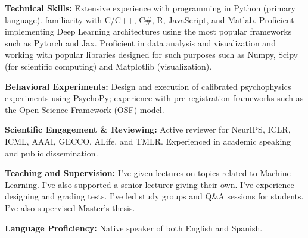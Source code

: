 \documentclass[10pt,a4paper]{article}
\begin{document}
\textbf{Technical Skills:} Extensive experience with programming in Python (primary language). familiarity with C/C++, C\#, R, JavaScript, and Matlab. Proficient implementing Deep Learning architectures using the most popular frameworks such as Pytorch and Jax. Proficient in data analysis and visualization and working with popular libraries designed for such purposes such as Numpy, Scipy (for scientific computing) and Matplotlib (visualization).


\vspace{0.35em}
\textbf{Behavioral Experiments:} Design and execution of calibrated psychophysics experiments using PsychoPy; experience with pre-registration frameworks such as the Open Science Framework (OSF) model.

\vspace{0.35em}
\textbf{Scientific Engagement \& Reviewing:} Active reviewer for NeurIPS, ICLR, ICML, AAAI, GECCO, ALife, and TMLR. Experienced in academic speaking and public dissemination.

\vspace{0.35em}
\textbf{Teaching and Supervision:} I've given lectures on topics related to Machine Learning. I've also supported a senior lecturer giving their own. I've experience designing and grading tests. I've led study groups and Q\&A sessions for students. I've also supervised Master's thesis.

\vspace{0.35em}
\textbf{Language Proficiency:} Native speaker of both English and Spanish.
\end{document}
